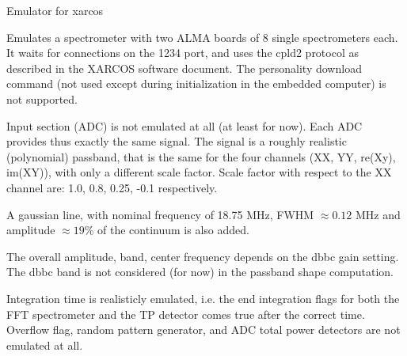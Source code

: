 Emulator for xarcos

Emulates a spectrometer with two ALMA boards of 8 single spectrometers
each. It waits for connections on the 1234 port, and uses the cpld2
protocol as described in the XARCOS software document. The personality
download command (not used except during initialization in the embedded
computer) is not supported.

Input section (ADC) is not emulated at all (at least for now). 
Each ADC provides thus exactly the same signal.
The signal is a roughly realistic (polynomial) passband, 
that is the same for the four channels (XX, YY, re(Xy), im(XY)),
with only a different scale factor.
Scale factor with respect to the XX channel are:
1.0, 0.8, 0.25, -0.1 respectively. 

A gaussian line, with nominal frequency of 18.75 MHz, 
FWHM $\approx0.12$ MHz and amplitude $\approx19$\% of the 
continuum is also added. 

The overall amplitude, band, center frequency depends on 
the dbbc gain setting. The dbbc band is not considered 
(for now) in the passband shape computation. 

Integration time is realisticly emulated, i.e. the end 
integration flags for both the FFT spectrometer and the 
TP detector comes true after the correct time. 
Overflow flag, random pattern generator, and ADC total power
detectors are not emulated at all. 
